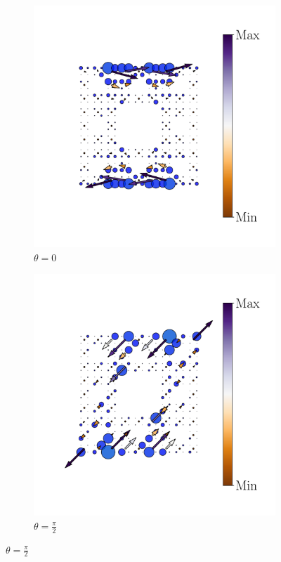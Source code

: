\begin{figure}[tbh!]
\begin{minipage}[h!]{1.0\textwidth}
\begin{subfigure}[b!]{0.2 \textwidth}
            \end{subfigure}\hspace*{-0.5em}
          \begin{subfigure}[b!]{0.2 \textwidth}
             \caption*{$\theta = 0$}
             \includegraphics[width=\textwidth]{Imagenes/Resultados_pump_Fractal/x/hoti_pomp_x_pos3.pdf}
         \end{subfigure}\hspace*{-0.5em}
          \begin{subfigure}[b!]{0.2 \textwidth}
             \caption*{$\theta = \frac{\pi}{2}$}
             \includegraphics[width=\textwidth]{Imagenes/Resultados_pump_Fractal/x/hoti_pomp_x_pos4.pdf}

\end{subfigure}
\end{minipage}
\end{figure}
